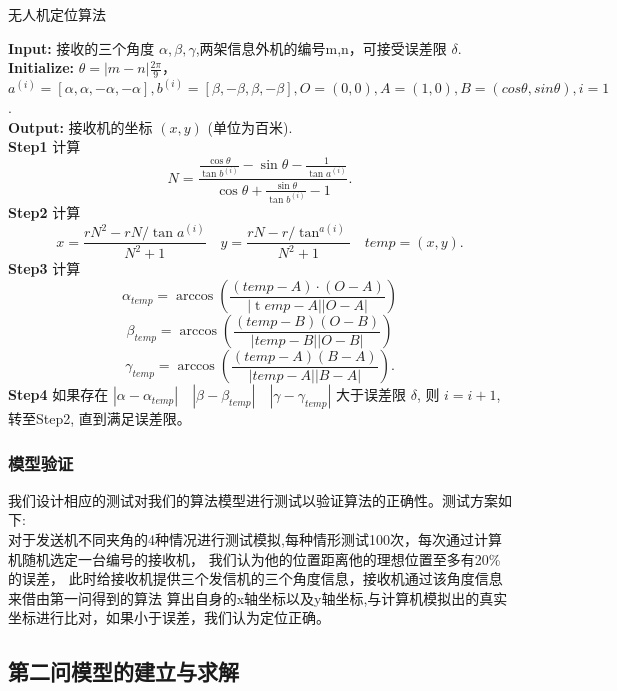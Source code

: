 \documentclass{my_paper}
\begin{document}
\begin{algorithm}[t]
\caption{\small 无人机定位算法}
\textbf{Input:} 接收的三个角度 $\alpha,\beta,\gamma$,两架信息外机的编号m,n，可接受误差限 $\delta$.\\
\textbf{Initialize:} $\theta=|m-n|\frac{2\pi}{9}$，$a^{(i)} = [\alpha,\alpha,-\alpha,-\alpha],b ^{(i)}= [\beta,-\beta,\beta,-\beta],O=(0,0),A=(1,0),B=(cos\theta,sin\theta),i=1$.\\
\textbf{Output:} 接收机的坐标 $(x,y)$ (单位为百米). \\
\textbf{Step1} 计算 $$N = \frac { \frac { \cos \theta } { \tan b^{(i)} } - \sin \theta - \frac { 1 } { \tan a^{(i)} } } { \cos \theta + \frac { \sin \theta } { \tan b^{(i)} } - 1 }.$$
\textbf{Step2} 计算 $$x= \frac { r N ^ { 2 } - r N / \tan a^{(i)} } { N ^ { 2 } + 1 } \quad y = \frac { r N - r / \tan ^{a(i)} } { N ^ { 2 } + 1 }\quad temp=(x,y).$$
\textbf{Step3} 计算 $$\alpha _ { t e m p } = \arccos ( \frac { ( temp  - A ) \cdot ( O - A ) } { | \operatorname temp - A | | O - A | } )$$ $$\beta _{ temp} = \arccos ( \frac { ( temp - B ) ( O - B ) } { | temp - B | | O - B | } )$$ $$\gamma_ { temp } = \arccos ( \frac { ( temp - A ) ( B - A ) } { |  temp - A | | B - A | } ).$$
\textbf{Step4} 如果存在 $|\alpha-\alpha_{temp}|\quad|\beta-\beta_{temp}|\quad|\gamma-\gamma_{temp}|$ 大于误差限 $\delta$, 则 $i=i+1$, 转至Step2, 直到满足误差限。
\end{algorithm}

\subsubsection{模型验证}
我们设计相应的测试对我们的算法模型进行测试以验证算法的正确性。测试方案如下:\\
对于发送机不同夹角的4种情况进行测试模拟,每种情形测试100次，每次通过计算机随机选定一台编号的接收机，
我们认为他的位置距离他的理想位置至多有20\%的误差，
此时给接收机提供三个发信机的三个角度信息，接收机通过该角度信息来借由第一问得到的算法
算出自身的x轴坐标以及y轴坐标,与计算机模拟出的真实坐标进行比对，如果小于误差，我们认为定位正确。



\subsection{第二问模型的建立与求解}
\end{document}
